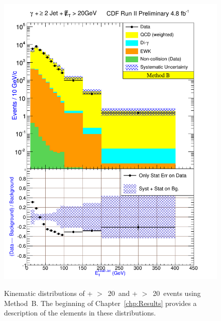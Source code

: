 \begin{figure}[h!]
{\includegraphics[keepaspectratio=true, scale=\resultsHistScale]{G30JetsMet20_MtdB_plot2_Et_j1.pdf}}
\caption{Kinematic distributions of \phoonejet + \met$>$~20~\etUnits and \photwojet + \met$>$~20~\etUnits events using \mbox{Method B}. The beginning of Chapter~\ref{chp:Results} provides a description of the elements in these distributions.}
\label{fig:pjmetMtdBSetTwo}
\end{figure}
\clearpage

